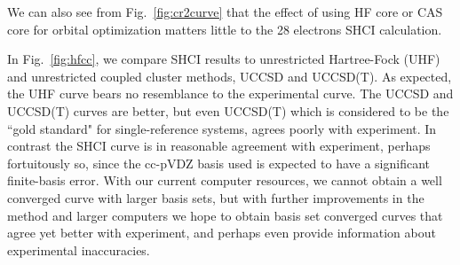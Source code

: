 We can also see from Fig.~\ref{fig:cr2curve} that the effect of using HF core or CAS core for orbital optimization matters little to the 28 electrons SHCI calculation.

In Fig.~\ref{fig:hfcc}, we compare SHCI results to unrestricted Hartree-Fock (UHF) and unrestricted coupled cluster methods, UCCSD and UCCSD(T).
As expected, the UHF curve bears no resemblance to the experimental curve.
The UCCSD and UCCSD(T) curves are better, but even UCCSD(T) which is considered to be the ``gold standard" for single-reference
systems, agrees poorly with experiment.  In contrast the SHCI curve is in reasonable agreement with experiment, perhaps
fortuitously so, since the cc-pVDZ basis used is expected to have a significant finite-basis error.
With our current computer resources, we cannot obtain a well converged curve with larger basis sets,
but with further improvements in the method and larger computers we hope to obtain basis set converged curves
that agree yet better with experiment, and perhaps even provide information about experimental inaccuracies.

